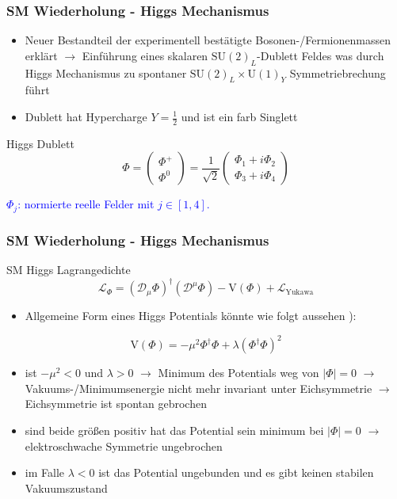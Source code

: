 \documentclass[xcolor=dvipsnames]{beamer}
\begin{document}
\begin{frame}
\frametitle{SM Wiederholung - Higgs Mechanismus }
\begin{itemize}
\item Neuer Bestandteil der experimentell bestätigte Bosonen-/Fermionenmassen erklärt $\rightarrow$ Einführung eines skalaren $\text{SU}(2)_{L}$-Dublett Feldes was durch Higgs Mechanismus zu spontaner $\text{SU}(2)_{L}\times\text{U}(1)_{Y}$ Symmetriebrechung führt
\item Dublett hat Hypercharge $Y=\frac{1}{2}$ und ist ein farb Singlett 
\end{itemize}

\begin{block}{Higgs Dublett}
\begin{equation*}
\Phi=\left( \begin{array}{c} \Phi^{+}\\ \Phi^{0} \end{array}\right)= \frac{1}{\sqrt{2}}\left( \begin{array}{c} \Phi_{1}+i\Phi_{2}\\ \Phi_{3}+i\Phi_{4} \end{array}\right)
\end{equation*}
\end{block}
\textcolor{Blue}{$\Phi_{j}$:  normierte reelle  Felder mit  $j \in [1,4] $. \autocite{4}}
\end{frame}

\begin{frame}
\frametitle{SM Wiederholung - Higgs Mechanismus }

\begin{block}{SM Higgs Lagrangedichte}
\begin{equation*}
\mathscr{L}_{\Phi}=(\mathscr{D}_{\mu}\Phi)^{\dagger}(\mathscr{D}^{\mu}\Phi) - \text{V}(\Phi) + \mathscr{L}_{\text{Yukawa}}
\end{equation*}
\end{block}
\begin{itemize}
\item  Allgemeine Form eines Higgs Potentials könnte wie folgt aussehen \autocite{4}):
\end{itemize}
\begin{equation*}
 \text{V}(\Phi)=-\mu^{2} \Phi^{\dagger}\Phi +\lambda ( \Phi^{\dagger}\Phi)^{2}
\end{equation*}

\begin{itemize}
\item ist $-\mu^{2}<0$ und $\lambda>0$  $\rightarrow$ Minimum des Potentials weg von $|\Phi|=0$ $\rightarrow$ Vakuums-/Minimumsenergie nicht mehr invariant unter Eichsymmetrie $\rightarrow$ Eichsymmetrie ist spontan gebrochen
\item sind beide größen positiv hat das Potential sein minimum bei  $|\Phi|=0$ $ \rightarrow$ elektroschwache Symmetrie ungebrochen
\item im Falle $\lambda<0$ ist das Potential ungebunden und es gibt keinen stabilen Vakuumszustand
\end{itemize}
\end{frame}
\end{document}
